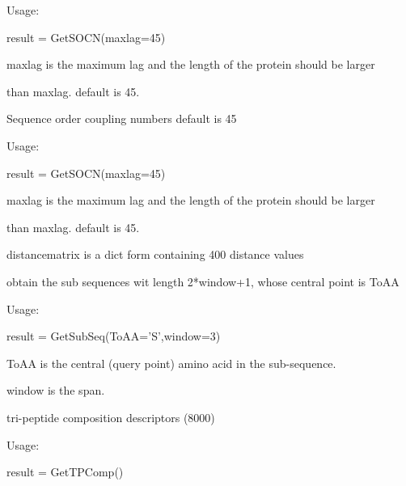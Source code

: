 \documentclass[letterpaper,10pt,english]{sphinxmanual}
\begin{document}
\begin{fulllineitems}
\begin{fulllineitems}
Usage:

result = GetSOCN(maxlag=45)

maxlag is the maximum lag and the length of the protein should be larger

than maxlag. default is 45.

\end{fulllineitems}


\begin{fulllineitems}
\label{reference/PyProteinclass:PyProtein.PyProtein.GetSOCNp}
Sequence order coupling numbers  default is 45

Usage:

result = GetSOCN(maxlag=45)

maxlag is the maximum lag and the length of the protein should be larger

than maxlag. default is 45.

distancematrix is a dict form containing 400 distance values

\end{fulllineitems}


\begin{fulllineitems}
\label{reference/PyProteinclass:PyProtein.PyProtein.GetSubSeq}
obtain the sub sequences wit length 2*window+1, whose central point is ToAA

Usage:

result = GetSubSeq(ToAA='S',window=3)

ToAA is the central (query point) amino acid in the sub-sequence.

window is the span.

\end{fulllineitems}


\begin{fulllineitems}
\label{reference/PyProteinclass:PyProtein.PyProtein.GetTPComp}
tri-peptide composition descriptors (8000)

Usage:

result = GetTPComp()


\end{fulllineitems}
\end{fulllineitems}
\end{document}
